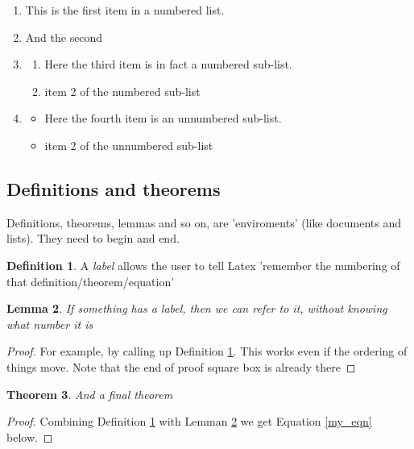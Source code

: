 \documentclass[a4paper,11pt]{article}
\newtheorem{theorem}{Theorem}[section]
\newtheorem{lemma}[theorem]{Lemma}
\theoremstyle{definition}
\newtheorem{definition}[theorem]{Definition}
\begin{document}
\begin{enumerate}
	\item This is the first item in a numbered list.

	\item And the second
	
	\item 
	\begin{enumerate}
		\item Here the third item is in fact a numbered sub-list.
		\item item 2 of the numbered sub-list
	\end{enumerate}

	\item 
	\begin{itemize}
		\item Here the fourth item is an unnumbered sub-list.
		\item item 2 of the unnumbered sub-list
	\end{itemize}
\end{enumerate}

\subsection{Definitions and theorems}

Definitions, theorems, lemmas and so on, are 'enviroments' (like documents and lists). They need to begin and end.

\begin{definition}\label{my_def}
	A \emph{label} allows the user to tell Latex 'remember the numbering of that definition/theorem/equation'
\end{definition}

\begin{lemma} \label{my_lem}
	If something has a label, then we can refer to it, without knowing what number it is 
\end{lemma}

\begin{proof}
	For example, by calling up Definition \ref{my_def}. This works even if the ordering of things move.
	Note that the end of proof square box is already there
\end{proof}

\begin{theorem}
	And a final theorem
\end{theorem}

\begin{proof}
	Combining Definition \ref{my_def} with Lemman \ref{my_lem} we get Equation \ref{my_eqn} below.
\end{proof}
\end{document}
